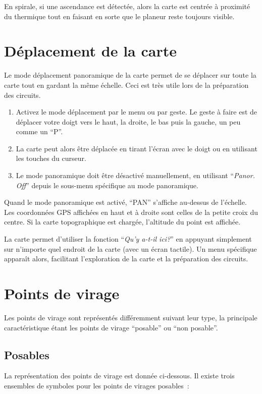 En spirale, si une ascendance est détectée, alors la carte est centrée à proximité du thermique
tout en faisant en sorte que le planeur reste toujours visible.

\section{Déplacement de la carte}\label{sec:panning}

Le mode déplacement panoramique de la carte permet de se déplacer sur toute la carte tout en gardant la même échelle. Ceci est très utile lors de la préparation des circuits.
\begin{enumerate}
\item Activez le mode déplacement par le menu ou par geste. Le geste à faire est de déplacer votre doigt vers le haut, la droite, le bas puis la gauche, un peu comme un ``P''.
\item La carte peut alors être déplacée en tirant l'écran avec le doigt ou en utilisant les touches du curseur.
\item Le mode panoramique doit être désactivé manuellement, en utilisant ``\emph{Panor. Off}'' depuis le
sous-menu spécifique au mode panoramique.
\end{enumerate} 

Quand le mode panoramique est activé, ``PAN'' s'affiche au-dessus de l'échelle. 
Les coordonnées GPS affichées en haut et à droite sont celles de la petite croix du centre. Si la carte topographique est chargée, l'altitude du point est affichée.

La carte permet d'utiliser la fonction ``\emph{Qu'y a-t-il ici?}'' en appuyant simplement sur n'importe
quel endroit de la carte (avec un écran tactile).
Un menu spécifique apparaît alors, facilitant l'exploration de la carte et la préparation des circuits.

\section{Points de virage}\label{sec:waypoint-schemes}
Les points de virage sont représentés différemment suivant leur type, la principale caractéristique étant les points de virage ``posable'' ou ``non posable''.

\subsection*{Posables}
La représentation des points de virage est donnée ci-dessous. Il existe trois ensembles de symboles pour les points de virages posables~:

